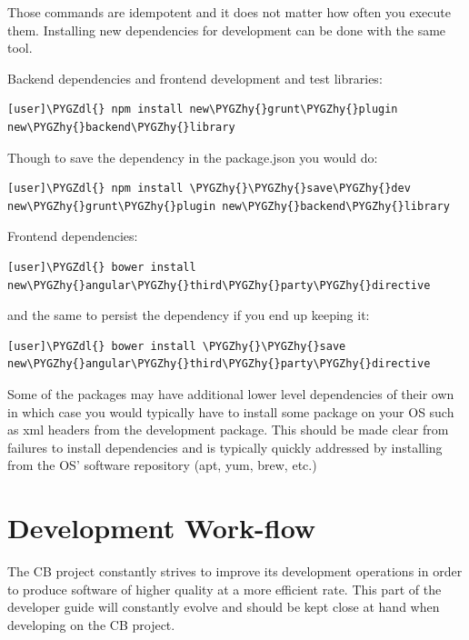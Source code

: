 \documentclass[letterpaper,10pt,english]{sphinxmanual}
\def\PYGZdl{\char`\$}
\def\PYGZhy{\char`\-}
\begin{document}
Those commands are idempotent and it does not matter how often you
execute them. Installing new dependencies for development can be done
with the same tool.

Backend dependencies and frontend development and test libraries:

\begin{Verbatim}[commandchars=\\\{\}]
[user]\PYGZdl{} npm install new\PYGZhy{}grunt\PYGZhy{}plugin new\PYGZhy{}backend\PYGZhy{}library
\end{Verbatim}

Though to save the dependency in the package.json you would do:

\begin{Verbatim}[commandchars=\\\{\}]
[user]\PYGZdl{} npm install \PYGZhy{}\PYGZhy{}save\PYGZhy{}dev new\PYGZhy{}grunt\PYGZhy{}plugin new\PYGZhy{}backend\PYGZhy{}library
\end{Verbatim}

Frontend dependencies:

\begin{Verbatim}[commandchars=\\\{\}]
[user]\PYGZdl{} bower install new\PYGZhy{}angular\PYGZhy{}third\PYGZhy{}party\PYGZhy{}directive
\end{Verbatim}

and the same to persist the dependency if you end up keeping it:

\begin{Verbatim}[commandchars=\\\{\}]
[user]\PYGZdl{} bower install \PYGZhy{}\PYGZhy{}save new\PYGZhy{}angular\PYGZhy{}third\PYGZhy{}party\PYGZhy{}directive
\end{Verbatim}

Some of the packages may have additional lower level dependencies of
their own in which case you would typically have to install some
package on your OS such as xml headers from the development
package. This should be made clear from failures to install
dependencies and is typically quickly addressed by installing from the
OS' software repository (apt, yum, brew, etc.)


\section{Development Work-flow}
\label{developer-guide:development-work-flow}
The CB project constantly strives to improve its development
operations in order to produce software of higher quality at a more
efficient rate. This part of the developer guide will constantly
evolve and should be kept close at hand when developing on the CB
project.
\end{document}
